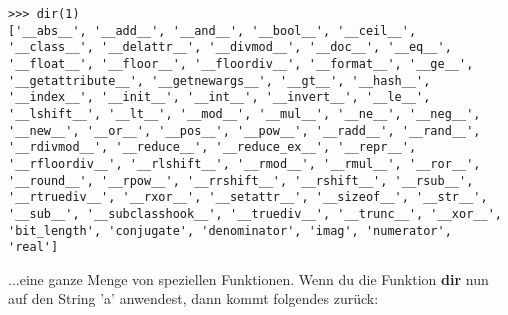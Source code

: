 \begin{Verbatim}[frame=single]
>>> dir(1)
['__abs__', '__add__', '__and__', '__bool__', '__ceil__',
'__class__', '__delattr__', '__divmod__', '__doc__', '__eq__',
'__float__', '__floor__', '__floordiv__', '__format__', '__ge__',
'__getattribute__', '__getnewargs__', '__gt__', '__hash__',
'__index__', '__init__', '__int__', '__invert__', '__le__',
'__lshift__', '__lt__', '__mod__', '__mul__', '__ne__', '__neg__',
'__new__', '__or__', '__pos__', '__pow__', '__radd__', '__rand__',
'__rdivmod__', '__reduce__', '__reduce_ex__', '__repr__',
'__rfloordiv__', '__rlshift__', '__rmod__', '__rmul__', '__ror__',
'__round__', '__rpow__', '__rrshift__', '__rshift__', '__rsub__',
'__rtruediv__', '__rxor__', '__setattr__', '__sizeof__', '__str__',
'__sub__', '__subclasshook__', '__truediv__', '__trunc__', '__xor__',
'bit_length', 'conjugate', 'denominator', 'imag', 'numerator',
'real']
\end{Verbatim}

$\ldots$eine ganze Menge von speziellen Funktionen. Wenn du die Funktion \textbf{dir} nun auf den String 'a' anwendest, dann kommt folgendes zurück:

